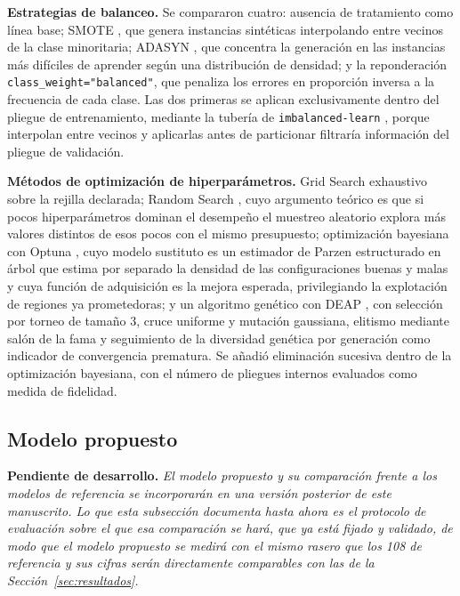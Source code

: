 \documentclass[pdflatex,sn-mathphys-num]{sn-jnl}
\begin{document}
\textbf{Estrategias de balanceo.} Se compararon cuatro: ausencia de tratamiento como línea base; SMOTE \cite{bib_smote}, que genera instancias sintéticas interpolando entre vecinos de la clase minoritaria; ADASYN \cite{bib_adasyn}, que concentra la generación en las instancias más difíciles de aprender según una distribución de densidad; y la reponderación \texttt{class\_weight="balanced"}, que penaliza los errores en proporción inversa a la frecuencia de cada clase. Las dos primeras se aplican exclusivamente dentro del pliegue de entrenamiento, mediante la tubería de \texttt{imbalanced-learn} \cite{bib_imblearn}, porque interpolan entre vecinos y aplicarlas antes de particionar filtraría información del pliegue de validación.

\textbf{Métodos de optimización de hiperparámetros.} Grid Search exhaustivo sobre la rejilla declarada; Random Search \cite{bib_bergstra_random}, cuyo argumento teórico es que si pocos hiperparámetros dominan el desempeño el muestreo aleatorio explora más valores distintos de esos pocos con el mismo presupuesto; optimización bayesiana con Optuna \cite{bib_optuna}, cuyo modelo sustituto es un estimador de Parzen estructurado en árbol \cite{bib_bergstra_tpe} que estima por separado la densidad de las configuraciones buenas y malas y cuya función de adquisición es la mejora esperada, privilegiando la explotación de regiones ya prometedoras; y un algoritmo genético con DEAP \cite{bib_deap}, con selección por torneo de tamaño 3, cruce uniforme y mutación gaussiana, elitismo mediante salón de la fama y seguimiento de la diversidad genética por generación como indicador de convergencia prematura. Se añadió eliminación sucesiva \cite{bib_jamieson,bib_hyperband} dentro de la optimización bayesiana, con el número de pliegues internos evaluados como medida de fidelidad.

\subsection{Modelo propuesto}\label{subsec:propuesto}

\textcolor{blue!55!black}{\textbf{Pendiente de desarrollo.}} \emph{El modelo propuesto y su comparación frente a los modelos de referencia se incorporarán en una versión posterior de este manuscrito. Lo que esta subsección documenta hasta ahora es el protocolo de evaluación sobre el que esa comparación se hará, que ya está fijado y validado, de modo que el modelo propuesto se medirá con el mismo rasero que los 108 de referencia y sus cifras serán directamente comparables con las de la Sección~\ref{sec:resultados}.}
\end{document}
